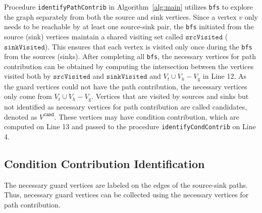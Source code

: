 Procedure \texttt{identifyPathContrib} in Algorithm~\ref{alg:main} utilizes \texttt{bfs} to explore the graph separately from both the source and sink vertices. 
Since a vertex $v$ only needs to be reachable by at least one source-sink pair, the \texttt{bfs} initiated from the source (sink) vertices maintain a shared visiting set called $\texttt{srcVisited}$ ($\texttt{sinkVisited}$). 
This ensures that each vertex is visited only once during the \texttt{bfs} from the sources (sinks). 
After completing all \texttt{bfs}, the necessary vertices for path contribution can be obtained by computing the intersection between the vertices visited both by $\texttt{srcVisited}$ and $\texttt{sinkVisited}$ and $V_{t} \cup V_{h} - V_{\text{g}}$ in Line 12.
As the guard vertices could not have the path contribution, the necessary vertices only come from $V_{t} \cup V_{h} - V_{\text{g}}$.
Vertices that are visited by sources and sinks but not identified as necessary vertices for path contribution are called candidates, denoted as $V^{\texttt{cand}}$. 
These vertices may have condition contribution, which are computed on Line 13 and passed to the procedure \texttt{identifyCondContrib} on Line 4.



\subsection{Condition Contribution Identification}
\label{sec:condition-identification}


The necessary guard vertices are labeled on the edges of the source-sink paths. 
Thus, necessary guard vertices can be collected using the necessary vertices for path contribution.


